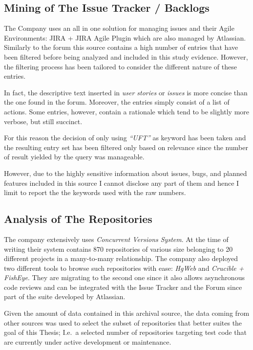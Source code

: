 \subsection{Mining of The Issue Tracker / Backlogs}
The Company uses an all in one solution for managing issues and their Agile Environments: JIRA + JIRA Agile Plugin which are also managed by Atlassian. Similarly to the forum this source contains a high number of entries that have been filtered before being analyzed and included in this study evidence. However, the filtering process has been tailored to consider the different nature of these entries.

In fact, the descriptive text inserted in \textit{user stories} or \textit{issues} is more concise than the one found in the forum. Moreover, the entries simply consist of a list of actions. Some entries, however, contain a rationale which tend to be slightly more verbose, but still succinct. 

For this reason the decision of only using \textit{``UFT''} as keyword has been taken and  the resulting entry set has been filtered only based on relevance since the number of result yielded by the query was manageable.

However, due to the highly sensitive information about issues, bugs, and planned features included in this source I cannot disclose any part of them and hence I limit to report the the keywords used with the raw numbers.


\subsection{Analysis of The Repositories} \label{analysis_of_the_repos}
The company extensively uses \textit{Concurrent Versions System}. At the time of writing their system contains 870 repositories of various size belonging to 20 different projects in a many-to-many relationship. The company also deployed two different tools to browse such repositories with ease: \textit{HgWeb} and \textit{Crucible + FishEye}. They are migrating to the second one since it also allows asynchronous code reviews and can be integrated with the Issue Tracker and the Forum since part of the suite developed by Atlassian.

Given the amount of data contained in this archival source, the data coming from other sources was used to select the subset of repositories that better suites the goal of this Thesis; I.e.\ a selected number of repositories targeting test code that are currently under active development or maintenance.


